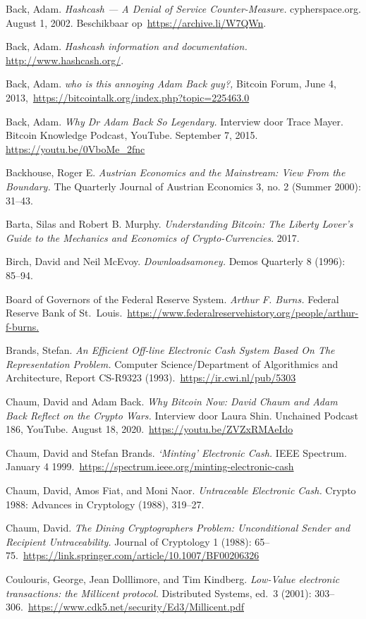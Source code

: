 \documentclass[
  a5paper,
  smalldemyvopaper,11pt,twoside,onecolumn,openright,extrafontsizes,
hidelinks]{memoir}
\begin{document}
Back, Adam. \emph{Hashcash --- A Denial of Service Counter-Measure.}
cypherspace.org. August 1, 2002. Beschikbaar
op~\url{https://archive.li/W7QWn}.

Back, Adam. \emph{Hashcash information and documentation.}
\url{http://www.hashcash.org/}.

Back, Adam. \emph{who is this annoying Adam Back guy?,} Bitcoin Forum,
June 4, 2013,~\url{https://bitcointalk.org/index.php?topic=225463.0}

Back, Adam. \emph{Why Dr Adam Back So Legendary.} Interview door Trace
Mayer. Bitcoin Knowledge Podcast, YouTube. September 7, 2015.
\url{https://youtu.be/0VboMe_2fnc}

Backhouse, Roger E. \emph{Austrian Economics and the Mainstream: View
From the Boundary.} The Quarterly Journal of Austrian Economics 3, no. 2
(Summer 2000): 31--43.

Barta, Silas and Robert B. Murphy. \emph{Understanding Bitcoin: The
Liberty Lover's Guide to the Mechanics and Economics of
Crypto-Currencies}. 2017.

Birch, David and Neil McEvoy. \emph{Downloadsamoney.} Demos Quarterly 8
(1996): 85--94.

Board of Governors of the Federal Reserve System. \emph{Arthur F.
Burns.} Federal Reserve Bank of
St.~Louis.~\url{https://www.federalreservehistory.org/people/arthur-f-burns.}

Brands, Stefan. \emph{An Efficient Off-line Electronic Cash System Based
On The Representation Problem.} Computer Science/Department of
Algorithmics and Architecture, Report CS-R9323
(1993).~\url{https://ir.cwi.nl/pub/5303}

Chaum, David and Adam Back. \emph{Why Bitcoin Now: David Chaum and Adam
Back Reflect on the Crypto Wars.} Interview door Laura Shin. Unchained
Podcast 186, YouTube. August 18,
2020.~\url{https://youtu.be/ZVZxRMAeIdo}

Chaum, David and Stefan Brands. \emph{`Minting' Electronic Cash.} IEEE
Spectrum. January 4
1999.~\url{https://spectrum.ieee.org/minting-electronic-cash}

Chaum, David, Amos Fiat, and Moni Naor. \emph{Untraceable Electronic
Cash.} Crypto 1988: Advances in Cryptology (1988), 319--27.

Chaum, David. \emph{The Dining Cryptographers Problem: Unconditional
Sender and Recipient Untraceability.} Journal of Cryptology 1 (1988):
65--75.~\url{https://link.springer.com/article/10.1007/BF00206326}

Coulouris, George, Jean Dolllimore, and Tim Kindberg. \emph{Low-Value
electronic transactions: the Millicent protocol.} Distributed Systems,
ed.~3 (2001):
303--306.~\url{https://www.cdk5.net/security/Ed3/Millicent.pdf}
\end{document}

